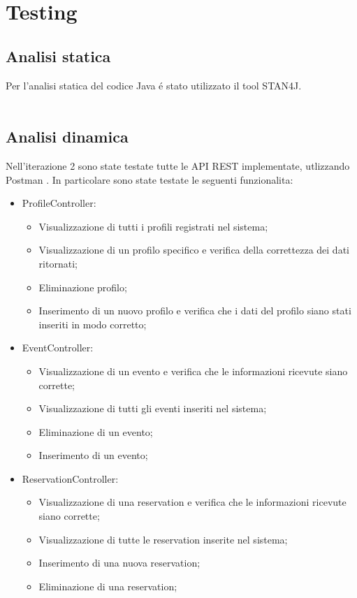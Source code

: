 \usepackage{pdfpages}
\section{Testing}
\subsection{Analisi statica}
Per l’analisi statica del codice Java é stato utilizzato il tool STAN4J.
\\
\\


\subsection{Analisi dinamica}
Nell’iterazione 2 sono state testate tutte le API REST implementate, utlizzando Postman .
In particolare sono state testate le seguenti funzionalita:

\begin{itemize}
	\item ProfileController:
	\begin{itemize}
		\item Visualizzazione di tutti i profili registrati nel sistema;
		\item Visualizzazione di un profilo specifico e verifica della correttezza dei dati ritornati;
		\item Eliminazione profilo;
		\item Inserimento di un nuovo profilo e verifica che i dati del profilo siano stati inseriti in modo corretto;
	\end{itemize}
	\item EventController:
	\begin{itemize}
		\item Visualizzazione di un evento e verifica che le informazioni ricevute siano corrette;
		\item Visualizzazione di tutti gli eventi inseriti nel sistema;
		\item Eliminazione di un evento;
		\item Inserimento di un evento;
	\end{itemize}
	\item ReservationController:
	\begin{itemize}
		\item Visualizzazione di una reservation e verifica che le informazioni ricevute siano corrette;
		\item Visualizzazione di tutte le reservation inserite nel sistema;
		\item Inserimento di una nuova reservation;
		\item Eliminazione di una reservation;
	\end{itemize}

\end{itemize}

